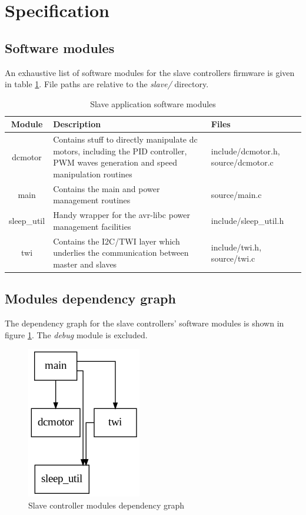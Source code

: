 \documentclass[binding=0.6cm,Lau]{sapthesis}
\makeatletter
\def\maxwidth#1{\ifdim\Gin@nat@width>#1 #1\else\Gin@nat@width\fi}
\makeatother
\begin{document}
\section{Specification}

\subsection{Software modules}
An exhaustive list of software modules for the slave controllers firmware is
given in table \ref{tab:slave-spec-modules}. File paths are relative to the
\emph{slave/} directory.

\begin{table}[bh]
  \begin{tabularx}{\textwidth}{c X X}
    \toprule
    Module & Description & Files \\
    \midrule
    dcmotor &
      Contains stuff to directly manipulate dc motors, including the PID controller, PWM waves generation and speed manipulation routines &
      include/dcmotor.h, source/dcmotor.c \\
    main &
      Contains the main and power management routines &
      source/main.c \\
    sleep\_util &
      Handy wrapper for the avr-libc power management facilities &
      include/sleep\_util.h \\
    twi &
      Contains the I2C/TWI layer which underlies the communication between master and slaves &
      include/twi.h, source/twi.c \\
    \bottomrule
  \end{tabularx}
  \caption{Slave application software modules}
  \label{tab:slave-spec-modules}
\end{table}


\subsection{Modules dependency graph}
The dependency graph for the slave controllers' software modules is shown in
figure \ref{img:slave-deps-graph}. The \emph{debug} module is excluded.
\begin{figure}[hbp]
\begin{centering}
  \includegraphics[width=\maxwidth{\textwidth}]{img/slave}
  \caption{Slave controller modules dependency graph}
  \label{img:slave-deps-graph}
\end{centering}
\end{figure}
\end{document}
